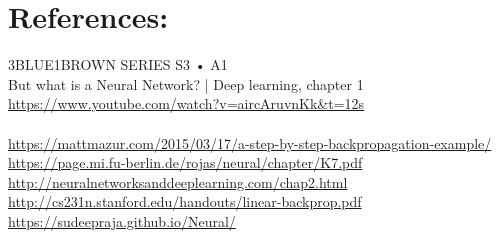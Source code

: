 \documentclass{article}
\begin{document}
\section{References:}
3BLUE1BROWN SERIES  S3 • A1
\\
But what is a Neural Network? | Deep learning, chapter 1 \url{https://www.youtube.com/watch?v=aircAruvnKk&t=12s}
\\
\\
\url{https://mattmazur.com/2015/03/17/a-step-by-step-backpropagation-example/}
\\
\url{https://page.mi.fu-berlin.de/rojas/neural/chapter/K7.pdf}
\\
\url{http://neuralnetworksanddeeplearning.com/chap2.html}
\\
\url{http://cs231n.stanford.edu/handouts/linear-backprop.pdf}
\\
\url{https://sudeepraja.github.io/Neural/}
\\
\\
\\
\\
\\
\\
\end{document}

